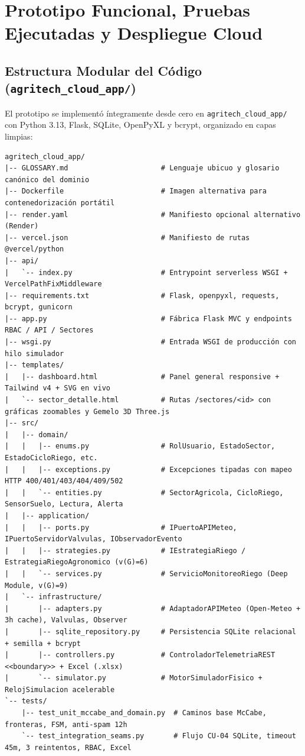 \documentclass[11pt,letterpaper]{report}
\begin{document}
\chapter{Prototipo Funcional, Pruebas Ejecutadas y Despliegue Cloud}

\section{Estructura Modular del Código (\texttt{agritech\_cloud\_app/})}
El prototipo se implementó íntegramente desde cero en \texttt{agritech\_cloud\_app/} con Python 3.13, Flask, SQLite, OpenPyXL y bcrypt, organizado en capas limpias:

\begin{lstlisting}[caption={Árbol real de archivos del prototipo \texttt{agritech\_cloud\_app/}.}]
agritech_cloud_app/
|-- GLOSSARY.md                      # Lenguaje ubicuo y glosario canónico del dominio
|-- Dockerfile                       # Imagen alternativa para contenedorización portátil
|-- render.yaml                      # Manifiesto opcional alternativo (Render)
|-- vercel.json                      # Manifiesto de rutas @vercel/python
|-- api/
|   `-- index.py                     # Entrypoint serverless WSGI + VercelPathFixMiddleware
|-- requirements.txt                 # Flask, openpyxl, requests, bcrypt, gunicorn
|-- app.py                           # Fábrica Flask MVC y endpoints RBAC / API / Sectores
|-- wsgi.py                          # Entrada WSGI de producción con hilo simulador
|-- templates/
|   |-- dashboard.html               # Panel general responsive + Tailwind v4 + SVG en vivo
|   `-- sector_detalle.html          # Rutas /sectores/<id> con gráficas zoomables y Gemelo 3D Three.js
|-- src/
|   |-- domain/
|   |   |-- enums.py                 # RolUsuario, EstadoSector, EstadoCicloRiego, etc.
|   |   |-- exceptions.py            # Excepciones tipadas con mapeo HTTP 400/401/403/404/409/502
|   |   `-- entities.py              # SectorAgricola, CicloRiego, SensorSuelo, Lectura, Alerta
|   |-- application/
|   |   |-- ports.py                 # IPuertoAPIMeteo, IPuertoServidorValvulas, IObservadorEvento
|   |   |-- strategies.py            # IEstrategiaRiego / EstrategiaRiegoAgronomico (v(G)=6)
|   |   `-- services.py              # ServicioMonitoreoRiego (Deep Module, v(G)=9)
|   `-- infrastructure/
|       |-- adapters.py              # AdaptadorAPIMeteo (Open-Meteo + 3h cache), Valvulas, Observer
|       |-- sqlite_repository.py     # Persistencia SQLite relacional + semilla + bcrypt
|       |-- controllers.py           # ControladorTelemetriaREST <<boundary>> + Excel (.xlsx)
|       `-- simulator.py             # MotorSimuladorFisico + RelojSimulacion acelerable
`-- tests/
    |-- test_unit_mccabe_and_domain.py  # Caminos base McCabe, fronteras, FSM, anti-spam 12h
    `-- test_integration_seams.py       # Flujo CU-04 SQLite, timeout 45m, 3 reintentos, RBAC, Excel
\end{lstlisting}
\end{document}
